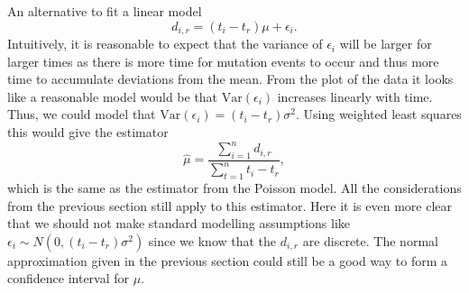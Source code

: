 \noindent An alternative to fit a linear model
\[
d_{i,r} = (t_i-t_r)\mu + \epsilon_i.
\]
Intuitively, it is reasonable to expect that the variance of $\epsilon_i$ will be larger for larger times as there is more time for mutation events to occur and thus more time to accumulate deviations from the mean. From the plot of the data it looks like a reasonable model would be that $\text{Var}(\epsilon_i)$ increases linearly with time. Thus, we could model that $\text{Var}(\epsilon_i) = (t_i-t_r)\sigma^2$. Using weighted least squares this would give the estimator
\[
\hat{\mu} = \frac{\sum_{i=1}^n d_{i,r}}{\sum_{t=1}^n t_i-t_r},
\]
which is the same as the estimator from the Poisson model. All the considerations from the previous section still apply to this estimator. Here it is even more clear that we should not make standard modelling assumptions like $\epsilon_i \sim N(0,(t_i-t_r)\sigma^2)$ since we know that the $d_{i,r}$ are discrete. The normal approximation given in the previous section could still be a good way to form a confidence interval for $\mu$. 





